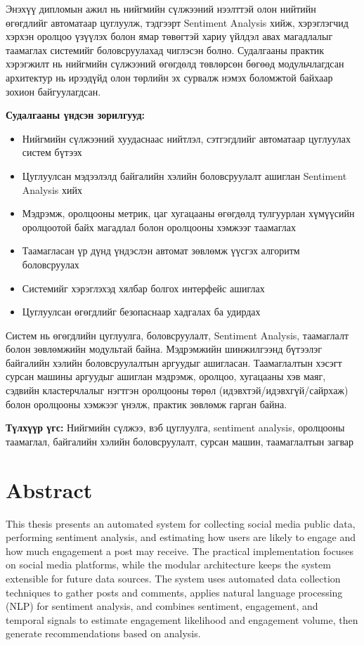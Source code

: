 \documentclass[12pt,a4paper]{report}
\begin{document}
Энэхүү дипломын ажил нь нийгмийн сүлжээний нээлттэй олон нийтийн өгөгдлийг автоматаар цуглуулж, тэдгээрт Sentiment Analysis хийж, хэрэглэгчид хэрхэн оролцоо үзүүлэх болон ямар төвөгтэй хариу үйлдэл авах магадлалыг таамаглах системийг боловсруулахад чиглэсэн болно. Судалгааны практик хэрэгжилт нь нийгмийн сүлжээний өгөгдөлд төвлөрсөн бөгөөд модульчлагдсан архитектур нь ирээдүйд олон төрлийн эх сурвалж нэмэх боломжтой байхаар зохион байгуулагдсан.

\textbf{Судалгааны үндсэн зорилгууд:}
\begin{itemize}
    \item Нийгмийн сүлжээний хуудаснаас нийтлэл, сэтгэгдлийг автоматаар цуглуулах систем бүтээх
    \item Цуглуулсан мэдээлэлд байгалийн хэлийн боловсруулалт ашиглан Sentiment Analysis хийх
    \item Мэдрэмж, оролцооны метрик, цаг хугацааны өгөгдөлд тулгуурлан хүмүүсийн оролцоотой байх магадлал болон оролцооны хэмжээг таамаглах
    \item Таамагласан үр дүнд үндэслэн автомат зөвлөмж үүсгэх алгоритм боловсруулах
    \item Системийг хэрэглэхэд хялбар болгох интерфейс ашиглах
    \item Цуглуулсан өгөгдлийг безопаснаар хадгалах ба удирдах
\end{itemize}

Систем нь өгөгдлийн цуглуулга, боловсруулалт, Sentiment Analysis, таамаглалт болон зөвлөмжийн модультай байна. Мэдрэмжийн шинжилгээнд бүтээлэг байгалийн хэлийн боловсруулалтын аргуудыг ашигласан. Таамаглалтын хэсэгт сурсан машины аргуудыг ашиглан мэдрэмж, оролцоо, хугацааны хэв маяг, сэдвийн кластерчлалыг нэгтгэн оролцооны төрөл (идэвхтэй/идэвхгүй/сайрхаж) болон оролцооны хэмжээг үнэлж, практик зөвлөмж гарган байна.

\textbf{Түлхүүр үгс:} Нийгмийн сүлжээ, вэб цуглуулга, sentiment analysis, оролцооны таамаглал, байгалийн хэлийн боловсруулалт, сурсан машин, таамаглалтын загвар

\chapter*{Abstract}

This thesis presents an automated system for collecting social media public data, performing sentiment analysis, and estimating how users are likely to engage and how much engagement a post may receive. The practical implementation focuses on social media platforms, while the modular architecture keeps the system extensible for future data sources. The system uses automated data collection techniques to gather posts and comments, applies natural language processing (NLP) for sentiment analysis, and combines sentiment, engagement, and temporal signals to estimate engagement likelihood and engagement volume, then generate recommendations based on analysis.
\end{document}
